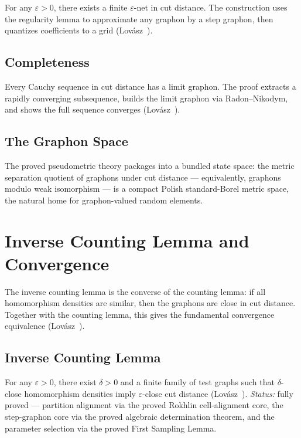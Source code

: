 For any $\varepsilon > 0$, there exists a finite $\varepsilon$-net in cut distance.
The construction uses the regularity lemma to approximate any graphon by
a step graphon, then quantizes coefficients to a grid
(Lov\'asz~\cite[Section~9.3]{lovasz2012}).


\section{Completeness}

Every Cauchy sequence in cut distance has a limit graphon.
The proof extracts a rapidly converging subsequence, builds the limit
graphon via Radon--Nikodym, and shows the full sequence converges
(Lov\'asz~\cite[Section~9.3]{lovasz2012}).


\section{The Graphon Space}

The proved pseudometric theory packages into a bundled state space: the metric
separation quotient of graphons under cut distance --- equivalently, graphons modulo
weak isomorphism --- is a compact Polish standard-Borel metric space, the natural home
for graphon-valued random elements.




\chapter{Inverse Counting Lemma and Convergence}

The inverse counting lemma is the converse of the counting lemma:
if all homomorphism densities are similar, then the graphons are close
in cut distance.  Together with the counting lemma, this gives the
fundamental convergence equivalence
(Lov\'asz~\cite[Section~10.6 and Theorem~11.5]{lovasz2012}).

\section{Inverse Counting Lemma}

For any $\varepsilon > 0$, there exist $\delta > 0$ and a finite family of
test graphs such that $\delta$-close homomorphism densities imply
$\varepsilon$-close cut distance
(Lov\'asz~\cite[Lemma~10.32]{lovasz2012}).
\emph{Status:} fully proved — partition alignment via the proved Rokhlin cell-alignment
core, the step-graphon core via the proved algebraic determination theorem, and the
parameter selection via the proved First Sampling Lemma.


